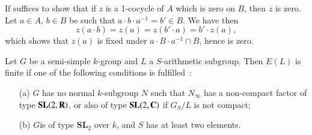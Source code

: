If suffices to show that if $z$ is a 1-cocycle of $A$ which is zero on $B$, then $z$ is zero. Let $a\in A$, $b\in B$ be such that $a\cdot b\cdot a^{-1}=b'\in B$. We have then
$$
z(a\cdot b)=z(a)=z(b'\cdot a)=b'\cdot z(a),
$$
which shows that $z(a)$ is fixed under $a\cdot B\cdot a^{-1}\cap B$, hence is zero.

\begin{theorem}\label{art04-thm3.6}
Let $G$ be a semi-simple $k$-group and $L$ a $S$-arithmetic subgroup. Then $E(L)$ is finite if one of the following conditions is fulfilled~:
\begin{itemize}
\item[{\rm(a)}] $G$ has no normal $k$-subgroup $N$ such that $N_{\infty}$ has a non-compact factor of type $\mathbf{SL}(2,\mathbf{R})$, or also of type $\mathbf{SL}(2,\mathbf{C})$ if $G_{S}/L$ is not compact;

\item[{\rm(b)}] $G$\pageoriginale is of type $\mathbf{SL}_{2}$ over $k$, and $S$ has at least two elements.
\end{itemize}
\end{theorem}

